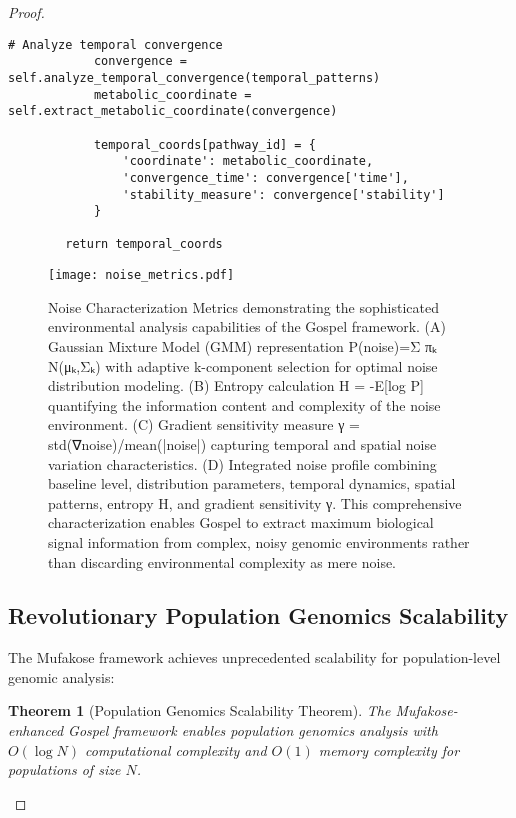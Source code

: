 \documentclass[12pt,a4paper]{article}
\newtheorem{theorem}{Theorem}[section]
\begin{document}
\begin{proof}
\begin{lstlisting}[style=pythonstyle, caption=Temporal Coordinate Optimization]
            # Analyze temporal convergence
            convergence = self.analyze_temporal_convergence(temporal_patterns)
            metabolic_coordinate = self.extract_metabolic_coordinate(convergence)
            
            temporal_coords[pathway_id] = {
                'coordinate': metabolic_coordinate,
                'convergence_time': convergence['time'],
                'stability_measure': convergence['stability']
            }
        
        return temporal_coords
\end{lstlisting}

\begin{figure}[H]
\centering
\texttt{[image: noise\_metrics.pdf]}
\caption{Noise Characterization Metrics demonstrating the sophisticated environmental analysis capabilities of the Gospel framework. (A) Gaussian Mixture Model (GMM) representation P(noise)=Σ πₖ N(μₖ,Σₖ) with adaptive k-component selection for optimal noise distribution modeling. (B) Entropy calculation H = -E[log P] quantifying the information content and complexity of the noise environment. (C) Gradient sensitivity measure γ = std(∇noise)/mean(|noise|) capturing temporal and spatial noise variation characteristics. (D) Integrated noise profile combining baseline level, distribution parameters, temporal dynamics, spatial patterns, entropy H, and gradient sensitivity γ. This comprehensive characterization enables Gospel to extract maximum biological signal information from complex, noisy genomic environments rather than discarding environmental complexity as mere noise.}
\label{fig:noise-characterization}
\end{figure}

\subsection{Revolutionary Population Genomics Scalability}

The Mufakose framework achieves unprecedented scalability for population-level genomic analysis:

\begin{theorem}[Population Genomics Scalability Theorem]
The Mufakose-enhanced Gospel framework enables population genomics analysis with $O(\log N)$ computational complexity and $O(1)$ memory complexity for populations of size $N$.
\end{theorem}


\end{proof}
\end{document}
